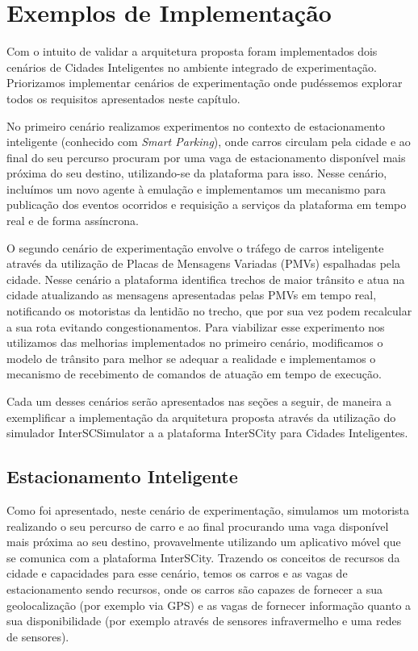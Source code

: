 \section{Exemplos de Implementação}

Com o intuito de validar a arquitetura proposta foram implementados dois cenários de Cidades Inteligentes no ambiente integrado de experimentação.
Priorizamos implementar cenários de experimentação onde pudéssemos explorar todos os requisitos apresentados neste capítulo.

No primeiro cenário realizamos experimentos no contexto de estacionamento inteligente (conhecido com \textit{Smart Parking}), onde carros circulam pela cidade e ao
final do seu percurso procuram por uma vaga de estacionamento disponível mais próxima do seu destino, utilizando-se da plataforma para isso.
Nesse cenário, incluímos um novo agente à emulação e implementamos um mecanismo para publicação dos eventos ocorridos e requisição a serviços da plataforma em tempo real
e de forma assíncrona.

O segundo cenário de experimentação envolve o tráfego de carros inteligente através da utilização de Placas de Mensagens Variadas (PMVs) espalhadas pela cidade.
Nesse cenário a plataforma identifica trechos de maior trânsito e atua na cidade atualizando as mensagens apresentadas pelas PMVs em tempo real, notificando os
motoristas da lentidão no trecho, que por sua vez podem recalcular a sua rota evitando congestionamentos.
Para viabilizar esse experimento nos utilizamos das melhorias implementados no primeiro cenário, modificamos o modelo de trânsito para melhor se adequar a realidade e
implementamos o mecanismo de recebimento de comandos de atuação em tempo de execução.

Cada um desses cenários serão apresentados nas seções a seguir, de maneira a exemplificar a implementação da arquitetura proposta através da utilização do simulador
InterSCSimulator a a plataforma InterSCity para Cidades Inteligentes.

\subsection{Estacionamento Inteligente}
\label{sec:smart_parking}

Como foi apresentado, neste cenário de experimentação, simulamos um motorista realizando o seu percurso de carro e ao final procurando uma vaga disponível mais próxima ao
seu destino, provavelmente utilizando um aplicativo móvel que se comunica com a plataforma InterSCity.
Trazendo os conceitos de recursos da cidade e capacidades para esse cenário, temos os carros e as vagas de estacionamento sendo recursos, onde os carros são capazes de
fornecer a sua geolocalização (por exemplo via GPS) e as vagas de fornecer informação quanto a sua disponibilidade (por exemplo através de sensores infravermelho e uma
redes de sensores).

